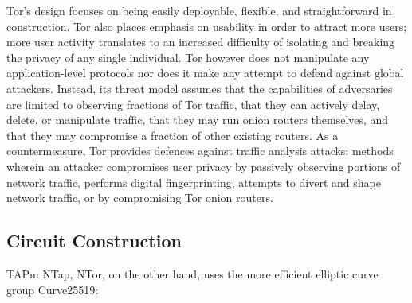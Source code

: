 Tor's design focuses on being easily deployable, flexible, and straightforward in construction. Tor also places emphasis on usability in order to attract more users; more user activity translates to an increased difficulty of isolating and breaking the privacy of any single individual. Tor however does not manipulate any application-level protocols nor does it make any attempt to defend against global attackers. Instead, its threat model assumes that the capabilities of adversaries are limited to observing fractions of Tor traffic, that they can actively delay, delete, or manipulate traffic, that they may run onion routers themselves, and that they may compromise a fraction of other existing routers. As a countermeasure, Tor provides defences against traffic analysis attacks: methods wherein an attacker compromises user privacy by passively observing portions of network traffic, performs digital fingerprinting, attempts to divert and shape network traffic, or by compromising Tor onion routers.\cite{dingledine2004tor}






\subsection{Circuit Construction}

TAPm \cite{goldberg2006security}
NTap, \cite{goldberg2013anonymity}
NTor, on the other hand, uses the more efficient elliptic curve group Curve25519: \cite{bernstein2006curve25519}









